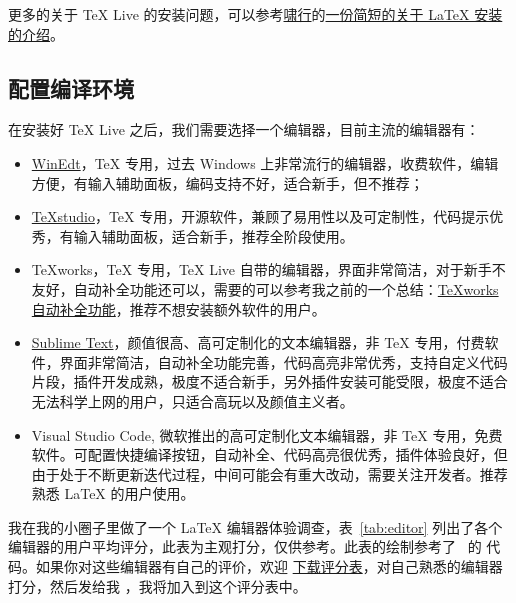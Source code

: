 \documentclass[11pt,a4paper]{dlove}
\begin{document}
更多的关于 \TeX{} Live 的安装问题，可以参考\href{https://github.com/OsbertWang}{啸行}的\href{https://github.com/OsbertWang/install-latex}{一份简短的关于 \LaTeX{} 安装的介绍}。

\subsection{配置编译环境}
在安装好 \TeX{} Live 之后，我们需要选择一个编辑器，目前主流的编辑器有：
\begin{itemize}
  \item \href{http://www.winedt.com/}{WinEdt}，\TeX{} 专用，过去 Windows 上非常流行的编辑器，收费软件，编辑方便，有输入辅助面板，编码支持不好，适合新手，但不推荐；
  \item \href{http://texstudio.sourceforge.net/}{\TeX{}studio}，\TeX{} 专用，开源软件，兼顾了易用性以及可定制性，代码提示优秀，有输入辅助面板，适合新手，推荐全阶段使用。
  \item \TeX{}works，\TeX{} 专用，\TeX{} Live 自带的编辑器，界面非常简洁，对于新手不友好，自动补全功能还可以，需要的可以参考我之前的一个总结：\href{https://github.com/EthanDeng/texworks-autocomplete}{\TeX{}works 自动补全功能}，推荐不想安装额外软件的用户。
  \item \href{http://www.sublimetext.com/}{Sublime Text}，颜值很高、高可定制化的文本编辑器，非 \TeX{} 专用，付费软件，界面非常简洁，自动补全功能完善，代码高亮非常优秀，支持自定义代码片段，插件开发成熟，极度不适合新手，另外插件安装可能受限，极度不适合无法科学上网的用户，只适合高玩以及颜值主义者。
  \item Visual Studio Code, 微软推出的高可定制化文本编辑器，非 \TeX{} 专用，免费软件。可配置快捷编译按钮，自动补全、代码高亮很优秀，插件体验良好，但由于处于不断更新迭代过程，中间可能会有重大改动，需要关注开发者。推荐熟悉 \LaTeX{} 的用户使用。
\end{itemize}

我在我的小圈子里做了一个 \LaTeX{} 编辑器体验调查，表~\ref{tab:editor} 列出了各个编辑器的用户平均评分，此表为主观打分，仅供参考。此表的绘制参考了~\cite{jake2019} 的 \TikZ{} 代码。如果你对这些编辑器有自己的评价，欢迎 \href{https://github.com/EthanDeng/mhlatex4econ/blob/master/archive/LaTeX 编辑器对比评分表.xlsx}{下载评分表}，对自己熟悉的编辑器打分，然后发给我 ，我将加入到这个评分表中。
\end{document}
